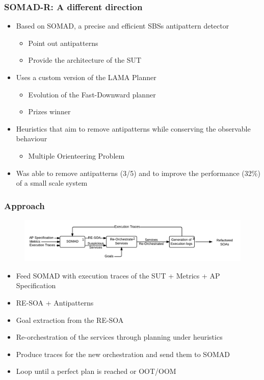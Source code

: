 \documentclass{beamer}
\begin{document}
\begin{frame}
\frametitle{SOMAD-R: A different direction}
\begin{itemize}
\item Based on SOMAD, a precise and efficient SBSs antipattern detector
\begin{itemize}
\item Point out antipatterns
\item Provide the architecture of the SUT
\end{itemize}
\item Uses a custom version of the LAMA Planner
\begin{itemize}
\item Evolution of the Fast-Downward planner
\item Prizes winner
\end{itemize}
\item Heuristics that aim to remove antipatterns while conserving the observable behaviour
\begin{itemize}
\item Multiple Orienteering Problem
\end{itemize}
\item Was able to remove antipatterns (3/5) and to improve the performance (32\%) of a small scale system
\end{itemize}
\end{frame}


\begin{frame}
\frametitle{Approach}

\begin{figure}
\includegraphics[width=1\linewidth]{media/approach.png}
\end{figure}
\begin{itemize}
\item Feed SOMAD with execution traces of the SUT + Metrics + AP Specification
\item RE-SOA + Antipatterns
\item Goal extraction from the RE-SOA
\item Re-orchestration of the services through planning under heuristics
\item Produce traces for the new orchestration and send them to SOMAD
\item Loop until a perfect plan is reached or OOT/OOM
\end{itemize}

\end{frame}
\end{document}
